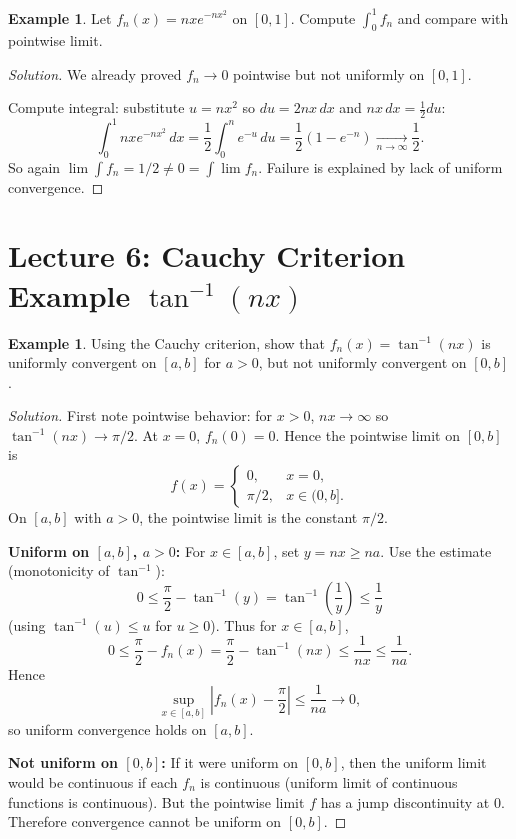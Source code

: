\documentclass[12pt]{article}
\theoremstyle{definition}
\newtheorem{example}[theorem]{Example}
\begin{document}
\begin{example}
Let $f_n(x)=n x e^{-n x^2}$ on $[0,1]$. Compute $\int_0^1 f_n$ and compare with pointwise limit.
\end{example}

\begin{proof}[Solution]
We already proved $f_n\to 0$ pointwise but not uniformly on $[0,1]$.

Compute integral: substitute $u= n x^2$ so $du=2n x\,dx$ and $n x\,dx=\frac12 du$:
\[
\int_0^1 n x e^{-n x^2}\,dx = \frac12 \int_{0}^{n} e^{-u}\,du
= \frac12(1-e^{-n}) \xrightarrow[n\to\infty]{}\frac12.
\]
So again $\lim \int f_n = 1/2 \ne 0 = \int \lim f_n$.
Failure is explained by lack of uniform convergence.
\end{proof}

\section{Lecture 6: Cauchy Criterion Example $\tan^{-1}(nx)$}

\begin{example}
Using the Cauchy criterion, show that $f_n(x)=\tan^{-1}(nx)$ is uniformly convergent on $[a,b]$ for $a>0$,
but not uniformly convergent on $[0,b]$.
\end{example}

\begin{proof}[Solution]
First note pointwise behavior: for $x>0$, $nx\to\infty$ so $\tan^{-1}(nx)\to \pi/2$.
At $x=0$, $f_n(0)=0$. Hence the pointwise limit on $[0,b]$ is
\[
f(x)=\begin{cases}
0,& x=0,\\
\pi/2,& x\in(0,b].
\end{cases}
\]
On $[a,b]$ with $a>0$, the pointwise limit is the constant $\pi/2$.

\textbf{Uniform on $[a,b]$, $a>0$:}
For $x\in[a,b]$, set $y=nx\ge na$. Use the estimate (monotonicity of $\tan^{-1}$):
\[
0\le \frac{\pi}{2}-\tan^{-1}(y)=\tan^{-1}\!\left(\frac{1}{y}\right)\le \frac{1}{y}
\]
(using $\tan^{-1}(u)\le u$ for $u\ge 0$).
Thus for $x\in[a,b]$,
\[
0\le \frac{\pi}{2}-f_n(x)=\frac{\pi}{2}-\tan^{-1}(nx)\le \frac{1}{nx}\le \frac{1}{na}.
\]
Hence
\[
\sup_{x\in[a,b]}\left|f_n(x)-\frac{\pi}{2}\right|\le \frac{1}{na}\to 0,
\]
so uniform convergence holds on $[a,b]$.

\textbf{Not uniform on $[0,b]$:}
If it were uniform on $[0,b]$, then the uniform limit would be continuous if each $f_n$ is continuous
(uniform limit of continuous functions is continuous).
But the pointwise limit $f$ has a jump discontinuity at $0$.
Therefore convergence cannot be uniform on $[0,b]$.
\end{proof}
\end{document}
